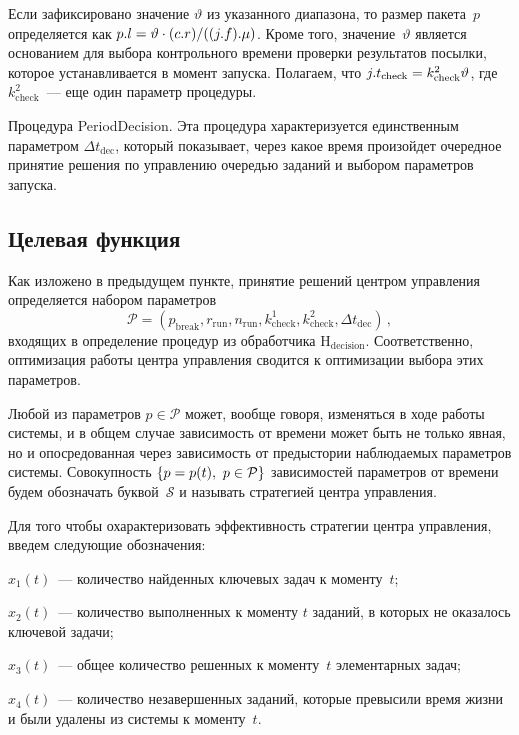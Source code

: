 \begin{multicols}{2}
    Если зафиксировано значение $\vartheta$ из указанного диапазона, то 
размер пакета~$p$ определяется как $p.l\hm=\vartheta\cdot (c.r)/((j.f).\mu)$. 
Кроме того, значение~$\vartheta$ является основанием для выбора 
контрольного времени проверки результатов посылки, которое 
устанавливается в момент запуска. Полагаем, что $j.t_{\mathrm{check}}\hm= 
k^2_{\mathrm{check}}\vartheta$, где $k^2_{\mathrm{check}}$~--- еще один 
параметр про\-це\-дуры.
    
    \smallskip
    Процедура {\sf PeriodDecision}. Эта процедура характеризуется 
единственным параметром $\Delta t_{\mathrm{dec}}$, который показывает, 
через какое время произойдет очередное принятие решения по управлению 
очередью заданий и выбором параметров запуска.

\subsection{Целевая функция}

    Как изложено в предыдущем пункте, принятие решений центром 
управления определяется набором параметров
    $$
\mathcal{P}=\left( p_{\mathrm{break}}, r_{\mathrm{run}}, n_{\mathrm{run}}, 
k^1_{\mathrm{check}}, k^2_{\mathrm{check}}, \Delta t_{\mathrm{dec}}\right)\,,
    $$
входящих в определение процедур из обработчика $
\mathrm{H}_{\mathrm{decision}}$. Соответственно, оптимизация работы центра 
управления сводится к оптимизации выбора этих параметров.
    
    Любой из параметров $p\in \mathcal{P}$ может, вообще говоря, изменяться в ходе 
работы системы, и в общем случае зависимость от времени может быть не 
только явная, но и опосредованная через зависимость от предыстории 
наблюдаемых параметров системы. Совокупность $\{p\hm= p(t),\ p\in \mathcal{P}\}$ 
зависимостей параметров от времени будем обозначать буквой~$\mathcal{S}$ и 
называть стратегией центра управления.
    
    Для того чтобы охарактеризовать эффективность стратегии центра 
управления, введем следующие обозначения:
    \begin{description}
    \item[\,] $x_1(t)$~--- количество найденных ключевых задач к 
моменту~$t$;
    \item[\,] $x_2(t)$~--- количество выполненных к моменту $t$ заданий, в 
которых не оказалось ключевой за\-дачи;
    \item[\,] $x_3(t)$~--- общее количество решенных к моменту~$t$ 
элементарных задач;
\item    $x_4(t)$~--- количество незавершенных заданий, которые превысили 
время жизни и были удалены из системы к моменту~$t$.
    \end{description}
    

\end{multicols}
